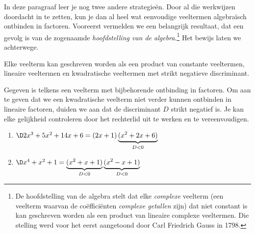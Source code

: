 \documentclass{ximera}
\begin{document}
In deze paragraaf leer je nog twee andere strategie\"en. Door al die werkwijzen doordacht in te zetten, kun je dan al heel wat eenvoudige veeltermen algebra\"isch ontbinden in factoren. Vooreerst vermelden we een belangrijk resultaat, dat een gevolg is van de zogenaamde {\em hoofdstelling van de algebra}.\footnote{De hoofdstelling van de algebra stelt dat elke {\em complexe} veelterm (een veelterm waarvan de co\"effici\"enten {\em complexe getallen} zijn) dat niet constant is kan geschreven worden als een product van lineaire complexe veeltermen. Die stelling werd voor het eerst aangetoond door Carl Friedrich Gauss in 1798.} Het bewijs laten we achterwege.

\begin{stelling}\label{stelling:ontbinden}
Elke veelterm kan geschreven worden als een product van constante veeltermen, lineaire veel\-termen en kwadratische veeltermen met strikt negatieve discriminant.
\end{stelling}

\begin{example}
Gegeven is telkens een veelterm met bijbehorende ontbinding in factoren. Om aan te geven dat we een kwadratische veelterm niet verder kunnen ontbinden in lineaire factoren, duiden we aan dat de discriminant $D$ strikt negatief is. Je kan elke gelijkheid controleren door het rechterlid uit te werken en te vereenvoudigen. 
\begin{enumerate}

\item
$\D 2x^3 + 5x^2 + 14x + 6 = (2x+1)\underbrace{(x^2+2x+6)}_{D < 0}$
\item
$\D x^4+x^2+1 = \underbrace{(x^2+x+1)}_{D < 0}\underbrace{(x^2-x+1)}_{D < 0}$
\end{enumerate}
\end{example}

\end{document}
